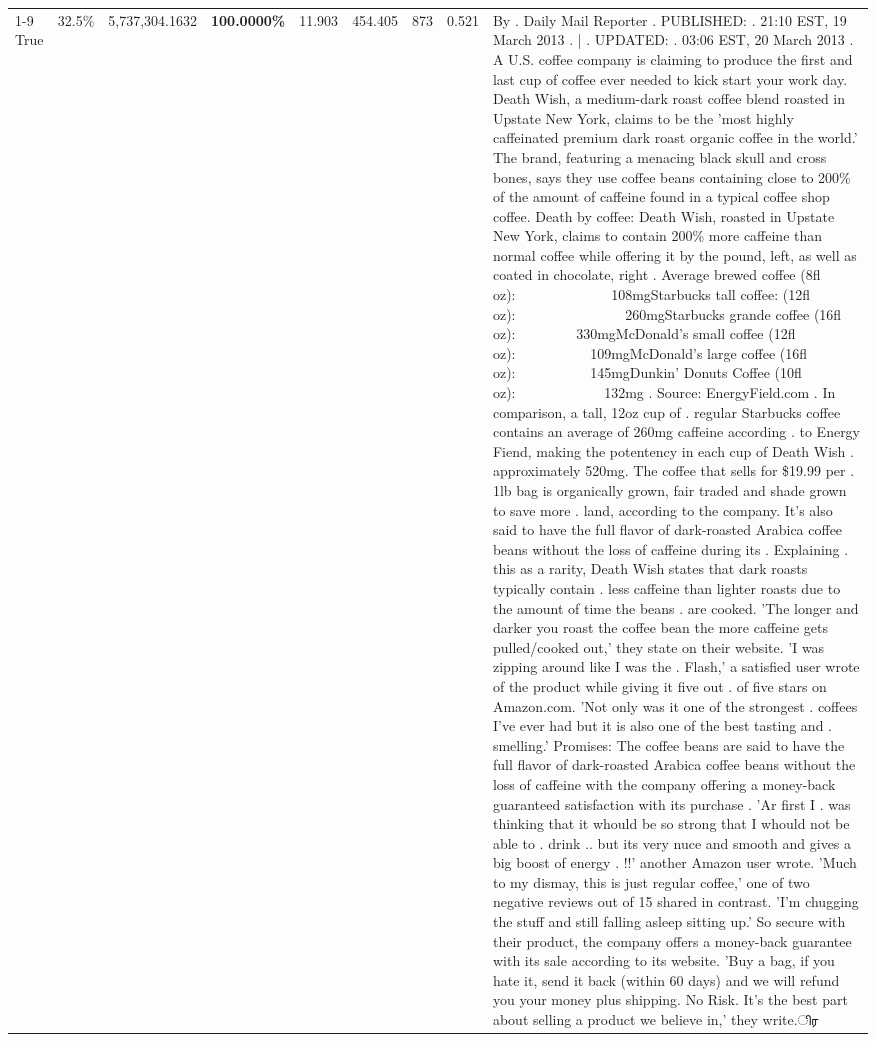 \begin{table}[H]
{\begin{tabular}{lllrlllll}
\cline{1-9}
True & 32.5\% & 5,737,304.1632 & \bfseries \color{red} 100.0000\% & 11.903 & 454.405 & 873 & 0.521 & By . Daily Mail Reporter . PUBLISHED: . 21:10 EST, 19 March 2013 . | . UPDATED: . 03:06 EST, 20 March 2013 . A U.S. coffee company is claiming to produce the first and last cup of coffee ever needed to kick start your work day. Death Wish, a medium-dark roast coffee blend roasted in Upstate New York, claims to be the 'most highly caffeinated premium dark roast organic coffee in the world.' The brand, featuring a menacing black skull and cross bones, says they use coffee beans containing close to 200\% of the amount of caffeine found in a typical coffee shop coffee. Death by coffee: Death Wish, roasted in Upstate New York, claims to contain 200\% more caffeine than normal coffee while offering it by the pound, left, as well as coated in chocolate, right . Average brewed coffee (8fl oz):              108mgStarbucks tall coffee: (12fl oz):                260mgStarbucks grande coffee (16fl oz):         330mgMcDonald's small coffee (12fl oz):           109mgMcDonald's large coffee (16fl oz):           145mgDunkin' Donuts Coffee (10fl oz):             132mg . Source: EnergyField.com . In comparison, a tall, 12oz cup of . regular Starbucks coffee contains an average of 260mg caffeine according . to Energy Fiend, making the potentency in each cup of Death Wish . approximately 520mg. The coffee that sells for \$19.99 per . 1lb bag is organically grown, fair traded and shade grown to save more . land, according to the company. It's also said to have the full flavor of dark-roasted Arabica coffee beans without the loss of caffeine during its . Explaining . this as a rarity, Death Wish states that dark roasts typically contain . less caffeine than lighter roasts due to the amount of time the beans . are cooked. 'The longer and darker you roast the coffee bean the more caffeine gets pulled/cooked out,' they state on their website. 'I was zipping around like I was the . Flash,' a satisfied user wrote of the product while giving it five out . of five stars on Amazon.com. 'Not only was it one of the strongest . coffees I've ever had but it is also one of the best tasting and . smelling.’ Promises: The coffee beans are said to have the full flavor of dark-roasted Arabica coffee beans without the loss of caffeine with the company offering a money-back guaranteed satisfaction with its purchase . 'Ar first I . was thinking that it whould be so strong that I whould not be able to . drink .. but its very nuce and smooth and gives a big boost of energy . !!' another Amazon user wrote. 'Much to my dismay, this is just regular coffee,' one of two negative reviews out of 15 shared in contrast. 'I'm chugging the stuff and still falling asleep sitting up.' So secure with their product, the company offers a money-back guarantee with its sale according to its website. 'Buy a bag, if you hate it, send it back (within 60 days) and we will refund you your money plus shipping. No Risk. It’s the best part about selling a product we believe in,' they write.ிர \\

\end{tabular}}
\end{table}

